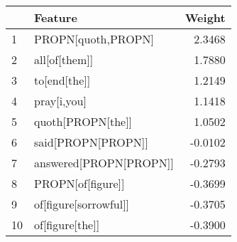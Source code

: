 \begin{tabular}{llr}
\toprule
{} &                 Feature &  Weight \\
\midrule
1  &      PROPN[quoth,PROPN] &  2.3468 \\
2  &           all[of[them]] &  1.7880 \\
3  &            to[end[the]] &  1.2149 \\
4  &             pray[i,you] &  1.1418 \\
5  &       quoth[PROPN[the]] &  1.0502 \\
6  &      said[PROPN[PROPN]] & -0.0102 \\
7  &  answered[PROPN[PROPN]] & -0.2793 \\
8  &       PROPN[of[figure]] & -0.3699 \\
9  &   of[figure[sorrowful]] & -0.3705 \\
10 &         of[figure[the]] & -0.3900 \\
\bottomrule
\end{tabular}
